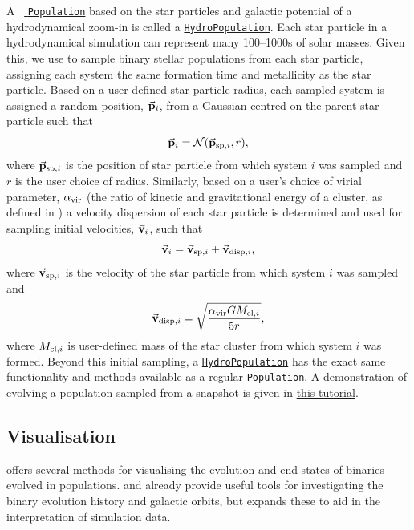 \documentclass[twocolumn, twocolappendix, oneside, linenumbers]{aastex631}
\newcommand{\codeLink}[2]{{\href{https://cogsworth.readthedocs.io/en/latest/api/cogsworth.#2.#1.html}{\color{codecolour} \texttt{#1}}}}
\newcommand{\tutorialLink}[2]{\href{#1}{{\color{codecolour}#2}}}
\begin{document}
A \cogsworth \ \codeLink{Population}{pop} based on the star particles and galactic potential of a hydrodynamical zoom-in is called a \codeLink{HydroPopulation}{hydro.pop}. Each star particle in a hydrodynamical simulation can represent many 100--1000s of solar masses. Given this, we use \cosmic to sample binary stellar populations from each star particle, assigning each system the same formation time and metallicity as the star particle. Based on a user-defined star particle radius, each sampled system is assigned a random position, $\va{p}_i$, from a Gaussian centred on the parent star particle such that
\begin{equation}
    \va{p}_i = \mathcal{N}(\va{p}_{{\rm sp}, i}, r),
\end{equation}
where $\va{p}_{{\rm sp}, i}$ is the position of star particle from which system $i$ was sampled and $r$ is the user choice of radius. Similarly, based on a user's choice of virial parameter, $\alpha_{\rm vir}$ (the ratio of kinetic and gravitational energy of a cluster, as defined in \citealp{Bertoldi+1992:1992ApJ...395..140B}) a velocity dispersion of each star particle is determined and used for sampling initial velocities, $\va{v}_i$, such that
\begin{equation}
    \va{v}_i = \va{v}_{{\rm sp}, i} + \va{v}_{{\rm disp}, i},
\end{equation}
where $\va{v}_{{\rm sp}, i}$ is the velocity of the star particle from which system $i$ was sampled and
\begin{equation}\label{eq:vel_disp_cluster}
    \va{v}_{{\rm disp}, i} = \sqrt{\frac{\alpha_{\rm vir} G M_{{\rm cl}, i}}{5 r}},
\end{equation}
where $M_{{\rm cl}, i}$ is user-defined mass of the star cluster from which system $i$ was formed. Beyond this initial sampling, a \codeLink{HydroPopulation}{hydro.pop} has the exact same functionality and methods available as a regular \codeLink{Population}{pop}. A demonstration of evolving a population sampled from a snapshot is given in \tutorialLink{https://cogsworth.readthedocs.io/en/latest/tutorials/hydro/pop.html}{this tutorial}.

\subsection{Visualisation}\label{sec:visuals}

\cogsworth offers several methods for visualising the evolution and end-states of binaries evolved in populations. \cosmic and \gala already provide useful tools for investigating the binary evolution history and galactic orbits, but \cogsworth expands these to aid in the interpretation of simulation data.
\end{document}
